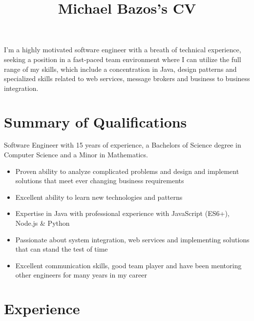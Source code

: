 \documentclass[a4paper,online]{adcv}
\title{Michael Bazos’s CV}
\begin{document}
I’m a highly motivated software engineer with a breath of technical experience, seeking a position in a fast-paced team environment where I can utilize the full range of my skills, which include a concentration in Java, design patterns and specialized skills related to web services, message brokers and business to business integration.

\section{Summary of Qualifications}

\begin{adcvtabletwo}
Software Engineer with 15 years of experience, a Bachelors of Science degree in Computer Science and a Minor in Mathematics.
  \begin{itemize}
    \item Proven ability to analyze complicated problems and design and implement solutions that meet ever changing business requirements
    \item Excellent ability to learn new technologies and patterns
    \item Expertise in Java with professional experience with JavaScript (ES6+), Node.js \& Python
    \item Passionate about system integration, web services and implementing solutions that can stand the test of time
    \item Excellent communication skills, good team player and have been mentoring other engineers for many years in my career
  \end{itemize}
\end{adcvtabletwo}

\section{Experience}
\end{document}
